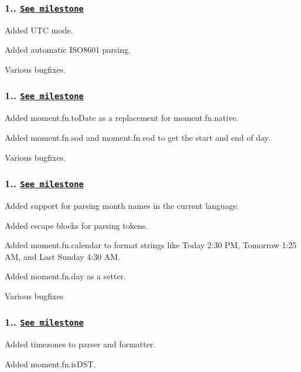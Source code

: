 \subsubsection*{1.. \href{https://github.com/timrwood/moment/issues?milestone=10&page=1&state=closed}{\tt See milestone}}

Added U\+TC mode.

Added automatic I\+S\+O8601 parsing.

Various bugfixes.

\subsubsection*{1.. \href{https://github.com/timrwood/moment/issues?milestone=8&state=closed}{\tt See milestone}}

Added {\ttfamily moment.\+fn.\+to\+Date} as a replacement for {\ttfamily moment.\+fn.\+native}.

Added {\ttfamily moment.\+fn.\+sod} and {\ttfamily moment.\+fn.\+eod} to get the start and end of day.

Various bugfixes.

\subsubsection*{1.. \href{https://github.com/timrwood/moment/issues?milestone=7&state=closed}{\tt See milestone}}

Added support for parsing month names in the current language.

Added escape blocks for parsing tokens.

Added {\ttfamily moment.\+fn.\+calendar} to format strings like \textquotesingle{}Today 2\+:30 PM\textquotesingle{}, \textquotesingle{}Tomorrow 1\+:25 AM\textquotesingle{}, and \textquotesingle{}Last Sunday 4\+:30 AM\textquotesingle{}.

Added {\ttfamily moment.\+fn.\+day} as a setter.

Various bugfixes

\subsubsection*{1.. \href{https://github.com/timrwood/moment/issues?milestone=4&state=closed}{\tt See milestone}}

Added timezones to parser and formatter.

Added {\ttfamily moment.\+fn.\+is\+D\+ST}.

